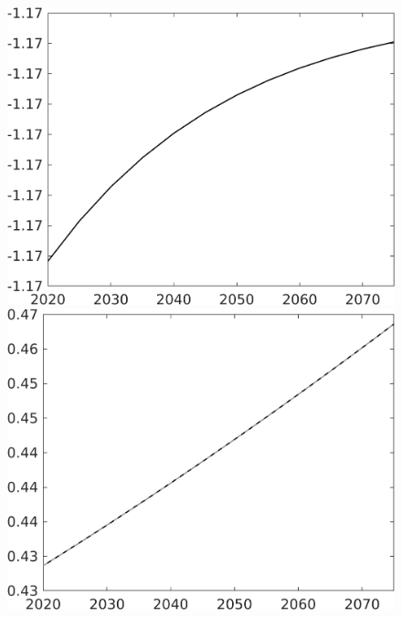 \documentclass[12pt]{article}
\begin{document}
\begin{figure}[h!!]
\begin{minipage}[]{0.32\textwidth}
\end{minipage}	
\begin{minipage}[]{0.32\textwidth}
\includegraphics[width=1\textwidth]{../../codding_model/own_basedOnFried/optimalPol_010922_revision/figures/all_13Sept22/CompTaul_LFBAUPer_Reg0_LgLf_spillover0_nsk0_xgr1_knspil1_sep1_countec0_GovRev0_etaa0.79.png}
\end{minipage}	
\begin{minipage}[]{0.32\textwidth}
	\includegraphics[width=1\textwidth]{../../codding_model/own_basedOnFried/optimalPol_010922_revision/figures/all_13Sept22/CompTaul_LFBAU_Reg0_EY_spillover0_nsk0_xgr1_knspil1_sep1_countec0_GovRev0_etaa0.79_lgd0.png}

\end{minipage}
\end{figure}
\end{document}
